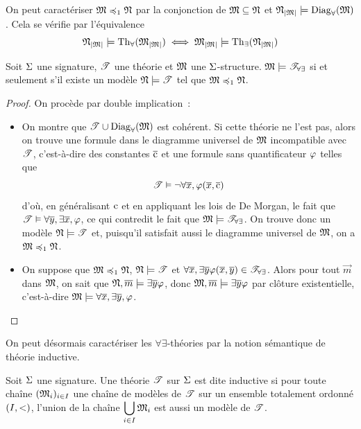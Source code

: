 \begin{remark}
  On peut caractériser $\mathfrak{M}\preccurlyeq_{1}\mathfrak{N}$ par la conjonction de
  $\mathfrak{M}\subseteq\mathfrak{N}$ et $\mathfrak{N}_{\left\vert \mathfrak{M}\right\vert}\models\operatorname{Diag}_{\forall}(\mathfrak{M})$.
  Cela se vérifie par l'équivalence
  \[\mathfrak{N}_{\left\vert \mathfrak{M}\right\vert}\models\operatorname{Th}_{\forall}(\mathfrak{M}_{\left\vert \mathfrak{M}\right\vert})\iff
  \mathfrak{M}_{\left\vert \mathfrak{M}\right\vert}\models\operatorname{Th}_{\exists}(\mathfrak{N}_{\left\vert \mathfrak{M}\right\vert})\]
\end{remark}

\begin{proposition}
  Soit $\Sigma$ une signature, $\mathscr T$ une théorie et $\mathfrak{M}$ une
  $\Sigma$-structure. $\mathfrak{M}\models\mathscr T_{\forall\exists}$ si et seulement s'il
  existe un modèle $\mathfrak{N}\models\mathscr T$ tel que $\mathfrak{M}\preccurlyeq_{1}\mathfrak{N}$.
\end{proposition}

\begin{proof}
  On procède par double implication~:
  \begin{itemize}
  \item[\fbox{$\Rightarrow$}] On montre que $\mathscr T\cup\operatorname{Diag}_{\forall}(\mathfrak{M})$
    est cohérent. Si cette théorie ne l'est pas, alors on trouve une formule
    dans le diagramme universel de $\mathfrak{M}$ incompatible avec $\mathscr T$,
    c'est-à-dire des constantes $\overline{\mathrm{c}}$ et une formule sans quantificateur
    $\varphi$ telles que
    \[\mathscr T\vDash\lnot\forall \overline{x}, \varphi(\overline{x},\overline{\mathrm{c}})\]
    d'où, en généralisant $\mathrm{c}$ et en appliquant les lois de De Morgan, le fait
    que $\mathscr T\vDash\forall \overline{y},\exists \overline{x},\varphi$, ce qui contredit le
    fait que $\mathfrak{M}\models\mathscr T_{\forall\exists}$. On trouve donc un modèle
    $\mathfrak{N}\models\mathscr T$ et, puisqu'il satisfait aussi le diagramme universel
    de $\mathfrak{M}$, on a $\mathfrak{M}\preccurlyeq_{1}\mathfrak{N}$.
  \item[\fbox{$\Leftarrow$}] On suppose que $\mathfrak{M}\preccurlyeq_{1}\mathfrak{N}$,
    $\mathfrak{N}\models\mathscr T$ et
    $\forall \overline{x},\exists \overline{y} \varphi(\overline{x},\overline{y})\in\mathscr T_{\forall\exists}$.
    Alors pour tout $\vec m$ dans $\mathfrak{M}$, on sait que
    $\mathfrak{N},\overline{m}\models\exists \overline{y} \varphi$, donc
    $\mathfrak{M},\overline{m}\models\exists \overline{y} \varphi$ par clôture existentielle,
    c'est-à-dire $\mathfrak{M}\models\forall\overline{x},\exists \overline{y},\varphi$.\qedhere
  \end{itemize}
\end{proof}

On peut désormais caractériser les $\forall\exists$-théories par la notion
sémantique de théorie inductive.

\begin{definition}
  Soit $\Sigma$ une signature. Une théorie $\mathscr T$ sur $\Sigma$ est dite inductive
  si pour toute chaîne $(\mathfrak{M}_i)_{i\in I}$ une chaîne de modèles de
  $\mathscr T$ sur un ensemble totalement ordonné $(I,<)$, l'union de la
  chaîne $\displaystyle\bigcup_{i\in I}\mathfrak{M}_i$ est aussi un modèle de
  $\mathscr T$.
\end{definition}

